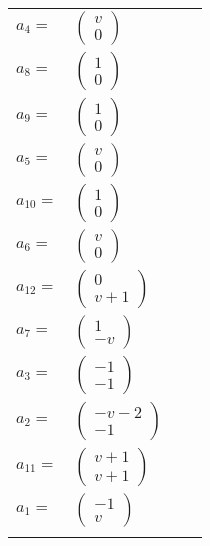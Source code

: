 \documentclass[1p]{elsarticle_modified}
\theoremstyle{definition}
\begin{document}
\begin{tabular}{m{7pt} m{180pt} m{7pt} m{180pt} }
\flushright $a_{4}=$&$\begin{pmatrix}v\\0\end{pmatrix}$ \\
\flushright $a_{8}=$&$\begin{pmatrix}1\\0\end{pmatrix}$ \\
\flushright $a_{9}=$&$\begin{pmatrix}1\\0\end{pmatrix}$ \\
\flushright $a_{5}=$&$\begin{pmatrix}v\\0\end{pmatrix}$ \\
\flushright $a_{10}=$&$\begin{pmatrix}1\\0\end{pmatrix}$ \\
\flushright $a_{6}=$&$\begin{pmatrix}v\\0\end{pmatrix}$ \\
\flushright $a_{12}=$&$\begin{pmatrix}0\\v+1\end{pmatrix}$ \\
\flushright $a_{7}=$&$\begin{pmatrix}1\\- v\end{pmatrix}$ \\
\flushright $a_{3}=$&$\begin{pmatrix}-1\\-1\end{pmatrix}$ \\
\flushright $a_{2}=$&$\begin{pmatrix}- v-2\\-1\end{pmatrix}$ \\
\flushright $a_{11}=$&$\begin{pmatrix}v+1\\v+1\end{pmatrix}$ \\
\flushright $a_{1}=$&$\begin{pmatrix}-1\\v\end{pmatrix}$\\&\end{tabular}
\end{document}
